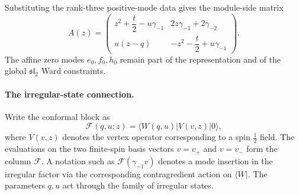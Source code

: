 \documentclass[a4paper,11pt]{article}
\newcommand{\slTwo}{\mathfrak{sl}_{2}}
\newcommand{\cF}{\mathcal{F}}
\numberwithin{equation}{section}
\begin{document}
Substituting the rank-three positive-mode data gives the module-side matrix
\begin{equation}
	A(z)
	=
	\begin{pmatrix}
		z^{2}+\dfrac{t}{2}-u\gamma_{-1}
		&
		2z\gamma_{-1}+2\gamma_{-2}
		\\[2mm]
		u(z-q)
		&
		-z^{2}-\dfrac{t}{2}+u\gamma_{-1}
	\end{pmatrix}.
\end{equation}
The affine zero modes $e_{0},f_{0},h_{0}$ remain part of the representation and of the
global $\slTwo$ Ward constraints.

\paragraph*{The irregular-state connection.}

Write the conformal block as
\begin{equation}
	\cF(q,u;z)
	=
	\langle W(q,u)|
	V(v,z)|0\rangle,
\end{equation}
where $V(v,z)$ denotes the vertex operator corresponding to a spin $\frac{1}{2}$ field. The evaluations on the two finite-spin basis vectors $v = v_+$ and $v= v_-$ form the column
$\cF$.  A notation such as $\cF(\gamma_{-1}v)$ denotes a mode
insertion in the irregular factor via the corresponding contragredient action on $\langle W |$.  The parameters $q,u$ act through
the family of irregular states.
\end{document}
